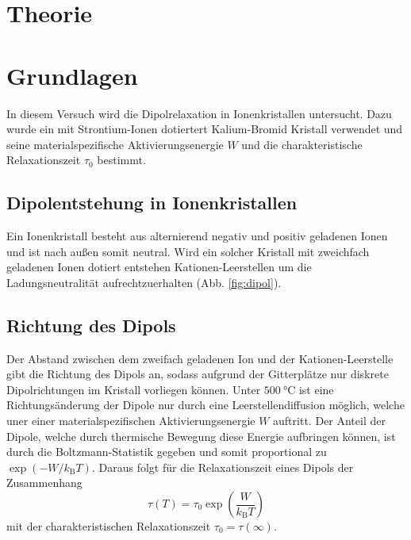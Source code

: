 \section{Theorie}
\label{sec:Theorie}


\section{Grundlagen}
\label{sec:grundlagen}

In diesem Versuch wird die Dipolrelaxation in Ionenkristallen untersucht. 
Dazu wurde ein mit Strontium-Ionen dotiertert Kalium-Bromid Kristall verwendet und seine materialspezifische Aktivierungsenergie $W$ und die charakteristische Relaxationszeit $\tau_0$ bestimmt.
\FloatBarrier

\subsection{Dipolentstehung in Ionenkristallen} %
\label{sub:dipolentstehung_in_ionenkristallen}

Ein Ionenkristall besteht aus alternierend negativ und positiv geladenen Ionen und ist nach außen somit neutral.
Wird ein solcher Kristall mit zweichfach geladenen Ionen dotiert entstehen Kationen-Leerstellen um die Ladungsneutralität aufrechtzuerhalten (Abb. \ref{fig:dipol}). 

\subsection{Richtung des Dipols} %
\label{sub:richtung_des_dipols}

Der Abstand zwischen dem zweifach geladenen Ion und der Kationen-Leerstelle gibt die Richtung des Dipols an, sodass aufgrund der Gitterplätze nur diskrete Dipolrichtungen im Kristall vorliegen können.
Unter $\SI{500}{\celsius}$ ist eine Richtungsänderung der Dipole nur durch eine Leerstellendiffusion möglich, welche uner einer materialspezifischen Aktivierungsenergie $W$ auftritt.
Der Anteil der Dipole, welche durch thermische Bewegung diese Energie aufbringen können, ist durch die Boltzmann-Statistik gegeben und somit proportional zu $\exp{\left(-W/k_\text{B}T\right)}$.
Daraus folgt für die Relaxationszeit eines Dipols der Zusammenhang
\begin{equation}
    \tau(T) = \tau_0 \exp{\left(\frac{W}{k_\text{B}T}\right)}
\end{equation}
mit der charakteristischen Relaxationszeit $\tau_0 = \tau(\infty)$.

